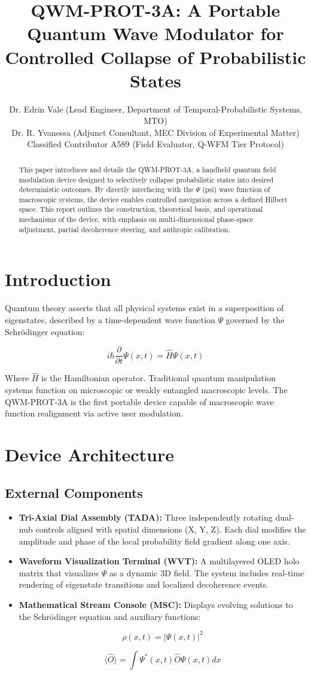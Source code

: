 \documentclass[12pt]{article}
\title{\textbf{QWM-PROT-3A: A Portable Quantum Wave Modulator for Controlled Collapse of Probabilistic States}}
\author{
    Dr. Edrin Vale (Lead Engineer, Department of Temporal-Probabilistic Systems, MTO)\\
    Dr. R. Yvanessa (Adjunct Consultant, MEC Division of Experimental Matter)\\
    Classified Contributor A589 (Field Evaluator, Q-WFM Tier Protocol)
}
\date{}
\begin{document}
\maketitle

\begin{abstract}
This paper introduces and details the QWM-PROT-3A, a handheld quantum field modulation device designed to selectively collapse probabilistic states into desired deterministic outcomes. By directly interfacing with the $\Psi$ (psi) wave function of macroscopic systems, the device enables controlled navigation across a defined Hilbert space. This report outlines the construction, theoretical basis, and operational mechanisms of the device, with emphasis on multi-dimensional phase-space adjustment, partial decoherence steering, and anthropic calibration.
\end{abstract}

\section{Introduction}
Quantum theory asserts that all physical systems exist in a superposition of eigenstates, described by a time-dependent wave function $\Psi$ governed by the Schrödinger equation:

\[
i\hbar \frac{\partial}{\partial t} \Psi(x,t) = \hat{H} \Psi(x,t)
\]

Where $\hat{H}$ is the Hamiltonian operator. Traditional quantum manipulation systems function on microscopic or weakly entangled macroscopic levels. The QWM-PROT-3A is the first portable device capable of macroscopic wave function realignment via active user modulation.

\section{Device Architecture}

\subsection{External Components}
\begin{itemize}
    \item \textbf{Tri-Axial Dial Assembly (TADA):} Three independently rotating dual-nub controls aligned with spatial dimensions (X, Y, Z). Each dial modifies the amplitude and phase of the local probability field gradient along one axis.
    \item \textbf{Waveform Visualization Terminal (WVT):} A multilayered OLED holo matrix that visualizes $\Psi$ as a dynamic 3D field. The system includes real-time rendering of eigenstate transitions and localized decoherence events.
    \item \textbf{Mathematical Stream Console (MSC):} Displays evolving solutions to the Schrödinger equation and auxiliary functions:

    \[
    \rho(x, t) = |\Psi(x, t)|^2
    \]

    \[
    \langle \hat{O} \rangle = \int \Psi^*(x, t) \hat{O} \Psi(x, t) dx
    \]
\end{itemize}
\end{document}
